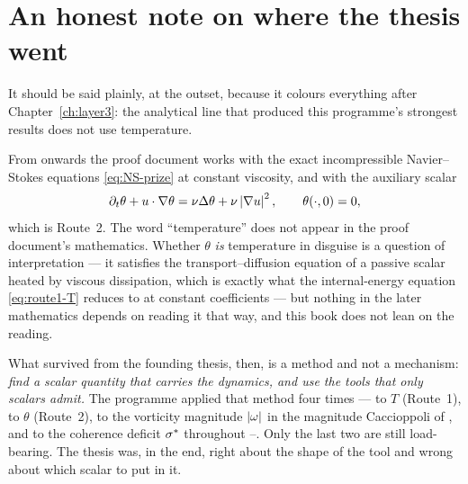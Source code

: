 \section{An honest note on where the thesis went}
\label{sec:where-thesis-went}

It should be said plainly, at the outset, because it colours everything after
Chapter~\ref{ch:layer3}: the analytical line that produced this programme's
strongest results does not use temperature.

From  onwards the proof document works with the exact incompressible
Navier--Stokes equations \eqref{eq:NS-prize} at constant viscosity, and with
the auxiliary scalar
\[
  \partial_t\theta + u\cdot\nabla\theta
    = \nu\Delta\theta + \nu\left|\nabla u\right|^2, \qquad \theta(\cdot,0)=0,
\]
which is Route~2. The word ``temperature'' does not appear in the proof
document's mathematics. Whether \(\theta\) \emph{is} temperature in disguise
is a question of interpretation --- it satisfies the transport--diffusion
equation of a passive scalar heated by viscous dissipation, which is exactly
what the internal-energy equation \eqref{eq:route1-T} reduces to at constant
coefficients --- but nothing in the later mathematics depends on reading it
that way, and this book does not lean on the reading.

What survived from the founding thesis, then, is a method and not a
mechanism: \emph{find a scalar quantity that carries the dynamics, and use the
tools that only scalars admit.} The programme applied that method four times
--- to \(T\) (Route~1), to \(\theta\) (Route~2), to the vorticity magnitude
\(\left|\omega\right|\) in the magnitude Caccioppoli of , and to the coherence
deficit \(\sigma^{*}\) throughout --. Only the last two are still
load-bearing. The thesis was, in the end, right about the shape of the tool
and wrong about which scalar to put in it.
